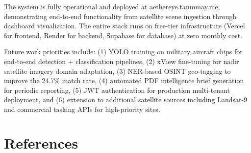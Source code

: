\documentclass[11pt,a4paper]{article}
\begin{document}
The system is fully operational and deployed at aethereye.tanmmay.me, demonstrating end-to-end functionality from satellite scene ingestion through dashboard visualization. The entire stack runs on free-tier infrastructure (Vercel for frontend, Render for backend, Supabase for database) at zero monthly cost.

Future work priorities include: (1) YOLO training on military aircraft chips for end-to-end detection + classification pipelines, (2) xView fine-tuning for nadir satellite imagery domain adaptation, (3) NER-based OSINT geo-tagging to improve the 24.7\% match rate, (4) automated PDF intelligence brief generation for periodic reporting, (5) JWT authentication for production multi-tenant deployment, and (6) extension to additional satellite sources including Landsat-9 and commercial tasking APIs for high-priority sites.

\hypertarget{references}{%
\section{References}\label{references}}
\end{document}

